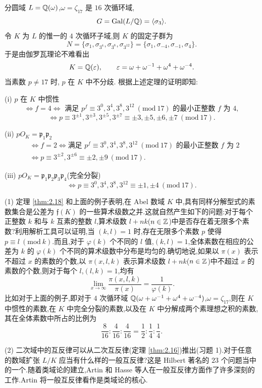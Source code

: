 \begin{example}\label{ex:ch2-s4-2-1}
分圆域 $L=\mathbb{Q}(\omega)$,$\omega=\zeta_{17}$ 是 $16$ 次循环域,
\[
  G=\operatorname{Gal}(L/\mathbb{Q})=\langle\sigma_3\rangle.
\]
令 $K$ 为 $L$ 的惟一的 $4$ 次循环子域,则 $K$ 的固定子群为
\[
  N=\{\sigma_1,\sigma_{3^4},\sigma_{3^8},\sigma_{3^{12}}\}
  =\{\sigma_1,\sigma_{-4},\sigma_{-1},\sigma_4\}.
\]
于是由伽罗瓦理论不难看出
\[
  K=\mathbb{Q}(\varepsilon),\qquad \varepsilon=\omega+\omega^{-1}+\omega^4+\omega^{-4}.
\]
当素数 $p\neq 17$ 时, $p$ 在 $K$ 中不分歧. 根据上述定理的证明即知:

(i) $p$ 在 $K$ 中惯性
\[
  \iff f=4
  \iff\text{ 满足 }p^f\equiv 3^0,3^4,3^8,3^{12}\ (\mathrm{mod}\ 17)\text{ 的最小正整数 }f\text{ 为 }4,
\]
\[
  \iff p\equiv 3^{\pm 1},3^{\pm 3},3^{\pm 5},3^{\pm 7}
  \equiv\pm 3,\pm 5,\pm 6,\pm 7\ (\mathrm{mod}\ 17).
\]

(ii) $pO_K=\mathfrak{p}_1\mathfrak{p}_2$
\begin{align*}
  &\iff f=2
  \iff\text{满足 }p^f\equiv 3^0,3^4,3^8,3^{12}\ (\mathrm{mod}\ 17)\text{ 的最小正整数 }f\text{ 为 }2\\
  &\iff p\equiv 3^{\pm 2},3^{\pm 6}\equiv\pm 2,\pm 9\ (\mathrm{mod}\ 17).
\end{align*}

(iii) $pO_K=\mathfrak{p}_1\mathfrak{p}_2\mathfrak{p}_3\mathfrak{p}_4$(完全分裂)
\[
  \iff p\equiv 3^0,3^4,3^8,3^{12}\equiv\pm 1,\pm 4\ (\mathrm{mod}\ 17).
\]
\end{example}

\begin{remark}
(1) 定理 \ref{thm:2.18} 和上面的例子表明,在 Abel 数域 $K$ 中,具有同样分解型式的素数集合是公差为 $\mathfrak{f}(K)$ 的一些算术级数之并.这就自然产生如下的问题:对于每个正整数 $k$ 和与 $k$ 互素的整数 $l$,算术级数 $l+nk$($n\in\mathbb{Z}$)中是否存在着无限多个素数?利用解析工具可以证明,当 $(k,l)=1$ 时,存在无限多个素数 $p$ 使得 $p\equiv l\ (\mathrm{mod}\ k)$.而且,对于 $\varphi(k)$ 个不同的 $l$ 值,$(k,l)=1$,全体素数在相应的公差为 $k$ 的 $\varphi(k)$ 个不同的算术级数中分布是均匀的.确切地说,如果以 $\pi(x)$ 表示不超过 $x$ 的素数的个数,以 $\pi(x,l,k)$ 表示算术级数 $l+nk$($n\in\mathbb{Z}$)中不超过 $x$ 的素数的个数,则对于每个 $l$,$(l,k)=1$,均有
\[
  \lim_{x\to\infty}\frac{\pi(x,l,k)}{\pi(x)}=\frac{1}{\varphi(k)}.
\]
比如对于上面的例子,即对于 $4$ 次循环域 $\mathbb{Q}(\omega+\omega^{-1}+\omega^4+\omega^{-4})$,$\omega=\zeta_{17}$,则在 $K$ 中惯性的素数,在 $K$ 中完全分裂的素数,以及在 $K$ 中分解成两个素理想之积的素数,其在全体素数中所占的比例为
\[
  \frac{8}{16}:\frac{4}{16}:\frac{4}{16}=\frac{1}{2}:\frac{1}{4}:\frac{1}{4}.
\]

(2) 二次域中的互反律可以从二次互反律(定理 \ref{thm:2.16})推出(习题 1).对于任意的数域扩张 $L/K$ 应当有什么样的一般互反律?这是 Hilbert 著名的 $23$ 个问题当中的一个.随着类域论的建立,Artin 和 Hasse 等人在一般互反律方面作了许多深刻的工作.Artin 将一般互反律看作是类域论的核心.
\end{remark}

